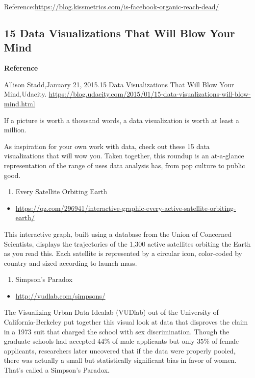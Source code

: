 \documentclass[]{book}
\providecommand{\tightlist}{%
  \setlength{\itemsep}{0pt}\setlength{\parskip}{0pt}}
\theoremstyle{definition}
\theoremstyle{definition}
\theoremstyle{definition}
\theoremstyle{remark}
\begin{document}
Reference:\url{https://blog.kissmetrics.com/is-facebook-organic-reach-dead/}

\subsection{15 Data Visualizations That Will Blow Your
Mind}\label{data-visualizations-that-will-blow-your-mind}

\textbf{Reference}

Allison Stadd,January 21, 2015.15 Data Visualizations That Will Blow
Your Mind,Udacity.
\url{https://blog.udacity.com/2015/01/15-data-visualizations-will-blow-mind.html}

If a picture is worth a thousand words, a data visualization is worth at
least a million.

As inspiration for your own work with data, check out these 15 data
visualizations that will wow you. Taken together, this roundup is an
at-a-glance representation of the range of uses data analysis has, from
pop culture to public good.

\begin{enumerate}
\def\labelenumi{\arabic{enumi}.}
\tightlist
\item
  Every Satellite Orbiting Earth
\end{enumerate}

\begin{itemize}
\tightlist
\item
  \url{https://qz.com/296941/interactive-graphic-every-active-satellite-orbiting-earth/}
\end{itemize}

This interactive graph, built using a database from the Union of
Concerned Scientists, displays the trajectories of the 1,300 active
satellites orbiting the Earth as you read this. Each satellite is
represented by a circular icon, color-coded by country and sized
according to launch mass.

\begin{enumerate}
\def\labelenumi{\arabic{enumi}.}
\setcounter{enumi}{1}
\tightlist
\item
  Simpson's Paradox
\end{enumerate}

\begin{itemize}
\tightlist
\item
  \url{http://vudlab.com/simpsons/}
\end{itemize}

The Visualizing Urban Data Idealab (VUDlab) out of the University of
California-Berkeley put together this visual look at data that disproves
the claim in a 1973 suit that charged the school with sex
discrimination. Though the graduate schools had accepted 44\% of male
applicants but only 35\% of female applicants, researchers later
uncovered that if the data were properly pooled, there was actually a
small but statistically significant bias in favor of women. That's
called a Simpson's Paradox.
\end{document}
